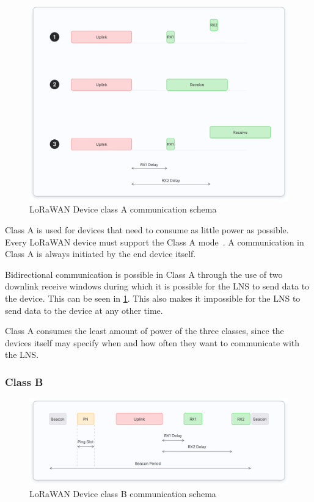 \begin{figure}
    \centering
    \includegraphics[width=1\textwidth]{pictures/device-classes/class-a.png}
    \caption{\ac{LoRaWAN} Device class A communication schema~\protect\cite{the_things_industries_bv_device_nodate}}\label{pic:lorawan-device-class-a-schema}
\end{figure}

Class A is used for devices that need to consume as little power as possible.
Every \ac{LoRaWAN} device must support the Class A mode~\cite[p. 11]{lora_alliance_inc_lorawan_2017}.
A communication in Class A is always initiated by the end device itself.

Bidirectional communication is possible in Class A through the use of two downlink receive windows during which it is possible for the \ac{LNS} to send data to the device.
This can be seen in \cref{pic:lorawan-device-class-a-schema}.
This also makes it impossible for the \ac{LNS} to send data to the device at any other time.

Class A consumes the least amount of power of the three classes, since the devices itself may specify when and how often they want to communicate with the \ac{LNS}.

\subsubsection{Class B}

\begin{figure}
    \centering
    \includegraphics[width=1\textwidth]{pictures/device-classes/class-b.png}
    \caption{\ac{LoRaWAN} Device class B communication schema~\protect\cite{the_things_industries_bv_device_nodate}}\label{pic:lorawan-device-class-b-schema}
\end{figure}

